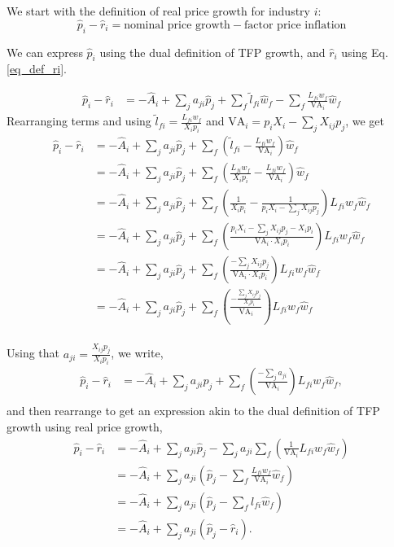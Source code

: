 \documentclass[11pt]{article}
\begin{document}
We start with the definition of real price growth for industry $i$:
\[
\hat{p}_i - \hat{r}_i = \text{nominal price growth} - \text{factor price inflation}
\]

We can express $\hat{p}_i$ using the dual definition of TFP growth, and $\hat{r}_i$ using Eq. \eqref{eq_def_ri}.

\begin{align*}
\hat{p}_i - \hat{r}_i 
&= -\hat{A}_i + \sum_j a_{ji} \hat{p}_j + \sum_f \tilde{l}_{fi} \hat{w}_f - \sum_f \frac{L_{fi} w_f}{\text{VA}_i} \hat{w}_f
\end{align*}
Rearranging terms and using $ \tilde{l}_{fi} = \frac{L_{fi} w_f}{X_i p_i}$ and $\text{VA}_i = p_i X_i - \sum_j X_{ij} p_j$, we get
\begin{align*}
\hat{p}_i - \hat{r}_i &= -\hat{A}_i + \sum_j a_{ji} \hat{p}_j + \sum_f \left( \tilde{l}_{fi} - \frac{L_{fi} w_f}{\text{VA}_i} \right) \hat{w}_f \\
 &= -\hat{A}_i + \sum_j a_{ji} \hat{p}_j + \sum_f \left( \frac{L_{fi} w_f}{X_i p_i} - \frac{L_{fi} w_f}{\text{VA}_i} \right) \hat{w}_f \\
&= -\hat{A}_i + \sum_j a_{ji} \hat{p}_j + \sum_f \left( \frac{1}{X_i p_i} - \frac{1}{p_i X_i - \sum_j X_{ij} p_j} \right) L_{fi} w_f \hat{w}_f \\
&= -\hat{A}_i + \sum_j a_{ji} \hat{p}_j + \sum_f \left( \frac{p_i X_i - \sum_j X_{ij} p_j - X_i p_i}{\text{VA}_i \cdot X_i p_i} \right) L_{fi} w_f \hat{w}_f \\
&= -\hat{A}_i + \sum_j a_{ji} \hat{p}_j + \sum_f \left( \frac{-\sum_j X_{ij} p_j}{\text{VA}_i \cdot X_i p_i} \right) L_{fi} w_f \hat{w}_f \\[1ex]
&= -\hat{A}_i + \sum_j a_{ji} \hat{p}_j + \sum_f \left( \frac{- \frac{\sum_j X_{ij} p_j}{X_i p_i} }{\text{VA}_i} \right) L_{fi} w_f \hat{w}_f \\
\end{align*}

Using that $a_{ji} = \frac{X_{ij} p_j}{X_i p_i} $, we write,
\begin{align*}
\hat{p}_i - \hat{r}_i &= -\hat{A}_i + \sum_j a_{ji} \hat{p}_j + \sum_f \left( \frac{- \sum_j a_{ji} }{\text{VA}_i} \right) L_{fi} w_f \hat{w}_f, \\
\end{align*}
and then rearrange to get an expression akin to the dual definition of TFP growth using real price growth,
\begin{align*}
\hat{p}_i - \hat{r}_i &= -\hat{A}_i + \sum_j a_{ji} \hat{p}_j - \sum_j a_{ji} \sum_f \left( \frac{1}{\text{VA}_i} L_{fi} w_f \hat{w}_f \right) \\
&= -\hat{A}_i + \sum_j a_{ji} \left( \hat{p}_j - \sum_f \frac{L_{fi} w_f}{\text{VA}_i} \hat{w}_f \right) \\
&= -\hat{A}_i + \sum_j a_{ji} \left( \hat{p}_j - \sum_f l_{fi} \hat{w}_f \right) \\
&= -\hat{A}_i + \sum_j a_{ji} \left( \hat{p}_j - \hat{r}_i \right).
\end{align*}
\end{document}
